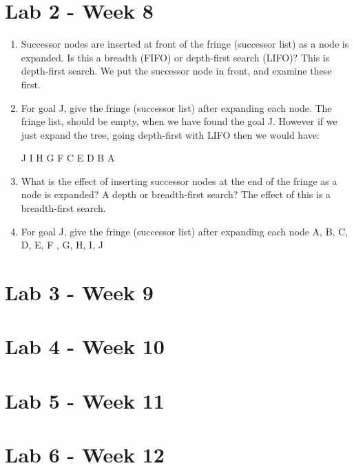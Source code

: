 \documentclass{article}
\begin{document}
\newpage
\section{Lab 2 - Week 8}%
\label{sec:lab_week_8}

\begin{enumerate}
  \item Successor nodes are inserted at front of the fringe (successor list) as
    a node is expanded. Is this a breadth (FIFO) or depth-first search (LIFO)?
    \subitem This is depth-first search. We put the successor node in front, and
    examine these first.

  \item For goal J, give the fringe (successor list) after expanding each node.
    \subitem The fringe list, should be empty, when we have found the goal J.
    However if we just expand the tree, going depth-first with LIFO then we
    would have: 
    \begin{center}
      J I H G F C E D B A 
    \end{center}
  \item What is the effect of inserting successor nodes at the end of the fringe
    as a node is expanded? A depth or breadth-first search?
    \subitem The effect of this is a breadth-first search.
  \item For goal J, give the fringe (successor list) after expanding each node
    \subitem A, B, C, D, E, F , G, H, I, J
\end{enumerate}

\newpage
\section{Lab 3 - Week 9}%
\label{sec:lab_week_9}


\newpage
\section{Lab 4 - Week 10}



\newpage
\section{Lab 5 - Week 11}


\newpage
\section{Lab 6 - Week 12}

\newpage
\printbibliography
\end{document}
